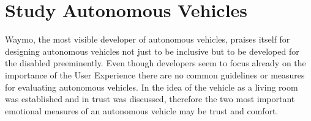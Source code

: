\section{Study Autonomous Vehicles}\label{sec:studies}
Waymo, the most visible developer of autonomous vehicles, praises itself for designing autonomous vehicles not just to be inclusive but to be developed for the disabled preeminently\cite{Waymo2018DriverlessApplication}. Even though developers seem to focus already on the importance of the User Experience there are no common guidelines or measures for evaluating autonomous vehicles. In  the idea of the vehicle as a living room was established and in  trust was discussed, therefore the two most important emotional measures of an autonomous vehicle may be trust and comfort.  

